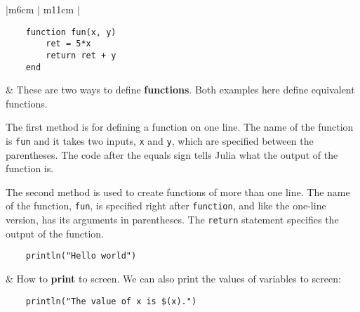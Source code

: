 \documentclass[]{article}
\begin{document}
\begin{longtable}{ |m{6cm}  | m{11cm} |}
\begin{verbatim}
    function fun(x, y)
        ret = 5*x
        return ret + y
    end
	\end{verbatim}
	& These are two ways to define \textbf{functions}. Both examples here define
    equivalent functions.

    The first method is for defining a function on one line. The name of the
    function is \texttt{fun} and it takes two inputs, \texttt{x} and
    \texttt{y}, which are specified between the parentheses. The code after
    the equals sign tells Julia what the output of the function is.

    The second method is used to create functions of more than one line. The
    name of the function, \texttt{fun}, is specified right after
    \texttt{function}, and like the one-line version, has its arguments in
    parentheses. The \texttt{return} statement specifies the output of the
    function.
    \\\hline
\begin{verbatim}
    println("Hello world")
	\end{verbatim}
	& How to \textbf{print} to screen. We can also print the values of
    variables to screen:
    \begin{verbatim}
    println("The value of x is $(x).")
    \end{verbatim}
    \\\hline

\end{longtable}
\end{document}
